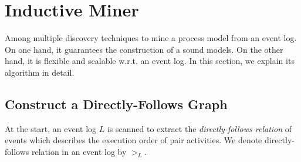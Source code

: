 \section{Inductive Miner}
Among multiple discovery techniques to mine a process model from an event log. On one hand, it guarantees the construction of a sound models. On the other hand, it is flexible and scalable w.r.t. an event log. In this section, we explain its algorithm in detail.
\subsection{Construct a Directly-Follows Graph}
At the start, an event log $L$ is scanned to extract the \emph{directly-follows relation} of events which describes the execution order of pair activities. We denote directly-follows relation in an event log by $>_L$. 
  
